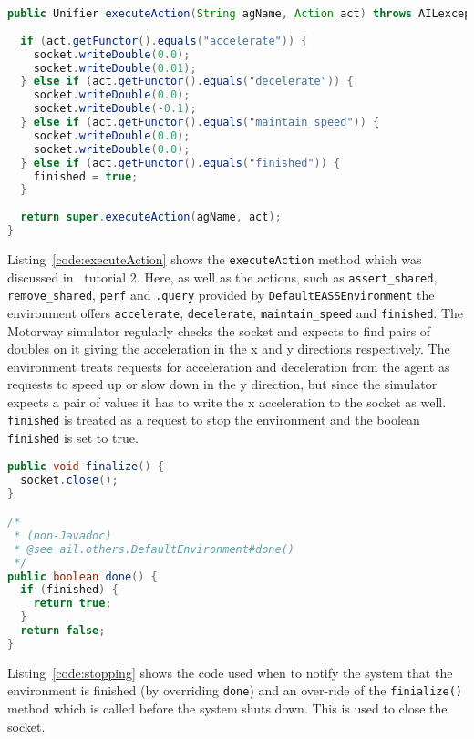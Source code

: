 \documentclass[a4]{article}
\begin{document}
\begin{lstlisting}[float,caption=executeAction,basicstyle=\sffamily,language=Java,label=code:executeAction,style=easslisting]
public Unifier executeAction(String agName, Action act) throws AILexception {
		
  if (act.getFunctor().equals("accelerate")) {
    socket.writeDouble(0.0);
    socket.writeDouble(0.01);
  } else if (act.getFunctor().equals("decelerate")) {
    socket.writeDouble(0.0);
    socket.writeDouble(-0.1);
  } else if (act.getFunctor().equals("maintain_speed")) {
    socket.writeDouble(0.0);
    socket.writeDouble(0.0);
  } else if (act.getFunctor().equals("finished")) {
    finished = true;
  }
		
  return super.executeAction(agName, act);
}
\end{lstlisting}
Listing~\ref{code:executeAction} shows the \texttt{executeAction} method which was discussed in \ail\ tutorial 2.  Here, as well as the actions, such as \lstinline{assert_shared}, \lstinline{remove_shared}, \lstinline{perf} and \lstinline{.query} provided by \texttt{DefaultEASSEnvironment} the environment offers \lstinline{accelerate}, \lstinline{decelerate}, \lstinline{maintain_speed} and \lstinline{finished}.  The Motorway simulator regularly checks the socket and expects to find pairs of doubles on it giving the acceleration in the x and y directions respectively.  The environment treats requests for acceleration and deceleration from the agent as requests to speed up or slow down in the y direction, but since the simulator expects a pair of values it has to write the x acceleration to the socket as well.  \lstinline{finished} is treated as a request to stop the environment and the boolean \texttt{finished} is set to true.

\begin{lstlisting}[float,caption=Stopping,basicstyle=\sffamily,language=Java,label=code:stopping,style=easslisting]
public void finalize() {
  socket.close();
}

/*
 * (non-Javadoc)
 * @see ail.others.DefaultEnvironment#done()
 */
public boolean done() {
  if (finished) {
    return true;
  }
  return false;
}
\end{lstlisting}
Listing~\ref{code:stopping} shows the code used when to notify the system that the environment is finished (by overriding \texttt{done}) and an over-ride of the \texttt{finialize()} method which is called before the system shuts down.  This is used to close the socket.
\end{document}
